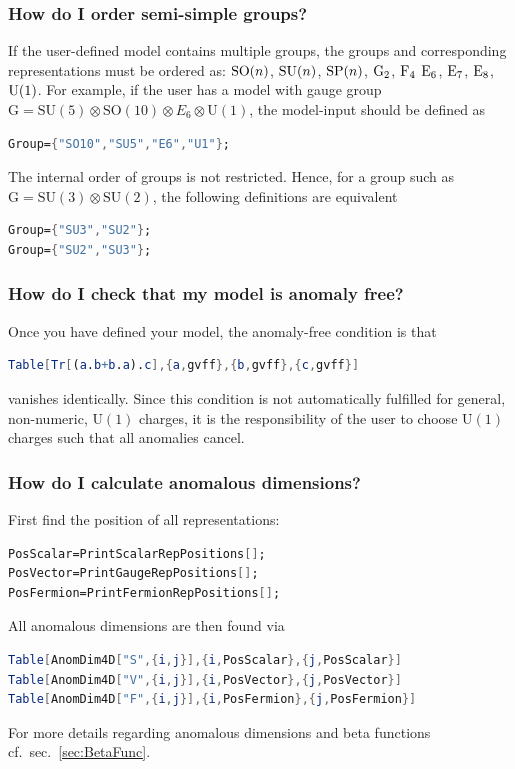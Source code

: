 \documentclass[11pt]{article}
\begin{document}
\subsubsection{How do I order semi-simple groups?}
If the user-defined model contains multiple groups, the groups and corresponding representations must be ordered as:
${\rm SO}(n)$,
${\rm SU}(n)$,
${\rm SP}(n)$,
${\rm G}_2$,
${\rm F}_4$
${\rm E}_6$,
${\rm E}_7$,
${\rm E}_8$,
${\rm U}(1)$.
For example, if the user has a model with gauge group
$
\mathrm{G}=\mathrm{SU}(5)\otimes
\mathrm{SO}(10)\otimes
E_6 \otimes
\mathrm{U}(1)$,
the model-input should be defined as
\begin{lstlisting}[language=Mathematica,mathescape=true]
Group={"SO10","SU5","E6","U1"};
\end{lstlisting}
The internal order of groups is not restricted.
Hence, for a group such as
$\mathrm{G}=
\mathrm{SU}(3)\otimes
\mathrm{SU}(2)$,
the following definitions are equivalent 
\begin{lstlisting}[language=Mathematica,mathescape=true]
Group={"SU3","SU2"};
Group={"SU2","SU3"};
\end{lstlisting}

%
\subsubsection{How do I check that my model is anomaly free?}
Once you have defined your model, the anomaly-free condition is that
\begin{lstlisting}[language=Mathematica,mathescape=true]
Table[Tr[(a.b+b.a).c],{a,gvff},{b,gvff},{c,gvff}]
\end{lstlisting}
vanishes identically.
Since this condition is not automatically fulfilled for
general, non-numeric,
$\mathrm{U}(1)$ charges,
it is the responsibility of the user to choose
$\mathrm{U}(1)$ charges such that all anomalies cancel.

%
\subsubsection{How do I calculate anomalous dimensions?}
\label{sec:AnomDim}

First find the position of all representations:
\begin{lstlisting}[language=Mathematica,mathescape=true]
PosScalar=PrintScalarRepPositions[];
PosVector=PrintGaugeRepPositions[];
PosFermion=PrintFermionRepPositions[];
\end{lstlisting}
%
All anomalous dimensions are then found via
\begin{lstlisting}[language=Mathematica,mathescape=true]
Table[AnomDim4D["S",{i,j}],{i,PosScalar},{j,PosScalar}]
Table[AnomDim4D["V",{i,j}],{i,PosVector},{j,PosVector}]
Table[AnomDim4D["F",{i,j}],{i,PosFermion},{j,PosFermion}]
\end{lstlisting}
%
For more details regarding anomalous dimensions and beta functions
cf.\ sec.~\ref{sec:BetaFunc}.
\end{document}
